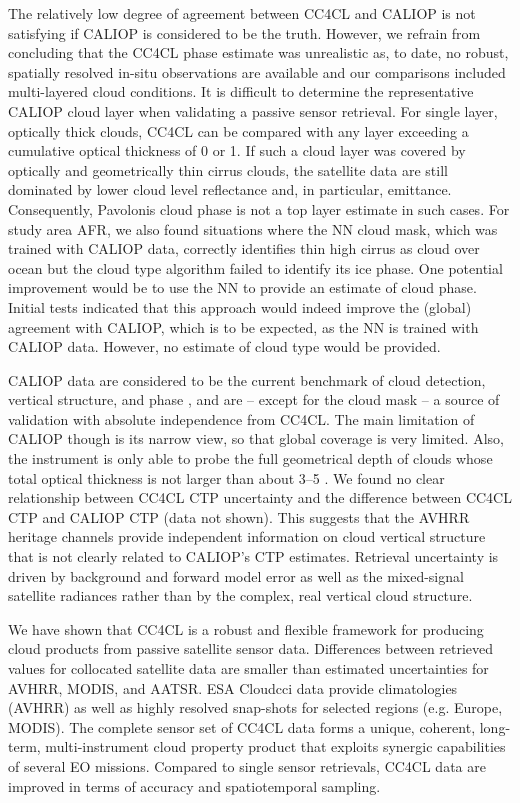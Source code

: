 The relatively low degree of agreement between CC4CL and CALIOP is not satisfying if CALIOP is considered to be the truth. However, we refrain from concluding that the CC4CL phase estimate was unrealistic as, to date, no robust, spatially resolved in-situ observations are available and our comparisons included multi-layered cloud conditions. It is difficult to determine the representative CALIOP cloud layer when validating a passive sensor retrieval. For single layer, optically thick clouds, CC4CL can be compared with any layer exceeding a cumulative optical thickness of 0 or 1. If such a cloud layer was covered by optically and geometrically thin cirrus clouds, the satellite data are still dominated by lower cloud level reflectance and, in particular, emittance. Consequently, Pavolonis cloud phase is not a top layer estimate in such cases. For study area AFR, we also found situations where the NN cloud mask, which was trained with CALIOP data, correctly identifies thin high cirrus as cloud over ocean but the cloud type algorithm failed to identify its ice phase. One potential improvement would be to use the NN to provide an estimate of cloud phase. Initial tests indicated that this approach would indeed improve the (global) agreement with CALIOP, which is to be expected, as the NN is trained with CALIOP data. However, no estimate of cloud type would be provided.

CALIOP data are considered to be the current benchmark of cloud detection, vertical structure, and phase \citep{Winker09,KarlssonJohansson13,Holz08}, and are -- except for the cloud mask -- a source of validation with absolute independence from CC4CL. The main limitation of CALIOP though is its narrow view, so that global coverage is very limited. Also, the instrument is only able to probe the full geometrical depth of clouds whose total optical thickness is not larger than about 3--5 \citep{KarlssonJohansson13}. We found no clear relationship between CC4CL CTP uncertainty and the difference between CC4CL CTP and CALIOP CTP (data not shown). This suggests that the AVHRR heritage channels provide independent information on cloud vertical structure that is not clearly related to CALIOP's CTP estimates. Retrieval uncertainty is driven by background and forward model error as well as the mixed-signal satellite radiances rather than by the complex, real vertical cloud structure.

\conclusions\label{conclusions}

We have shown that CC4CL is a robust and flexible framework for producing cloud products from passive satellite sensor data. Differences between retrieved values for collocated satellite data are smaller than estimated uncertainties for AVHRR, MODIS, and AATSR. ESA Cloud\textunderscore cci data provide climatologies (AVHRR) as well as highly resolved snap-shots for selected regions (e.g. Europe, MODIS). The complete sensor set of CC4CL data forms a unique, coherent, long-term, multi-instrument cloud property product that exploits synergic capabilities of several EO missions. Compared to single sensor retrievals, CC4CL data are improved in terms of accuracy and spatiotemporal sampling.

